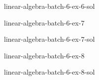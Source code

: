 \documentclass[preview]{standalone}
\begin{document}
\begin{snippetsolution}{linear-algebra-batch-6-ex-6-sol}{}
    \todo
\end{snippetsolution}

\begin{snippetexercise}{linear-algebra-batch-6-ex-7}{}
    \todo
\end{snippetexercise}

\begin{snippetsolution}{linear-algebra-batch-6-ex-7-sol}{}
    \todo
\end{snippetsolution}

\begin{snippetexercise}{linear-algebra-batch-6-ex-8}{}
    \todo
\end{snippetexercise}

\begin{snippetsolution}{linear-algebra-batch-6-ex-8-sol}{}
    \todo
\end{snippetsolution}
\end{document}

